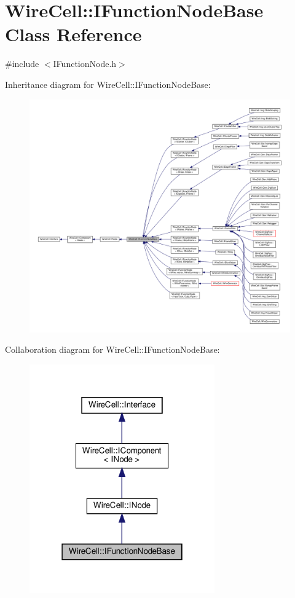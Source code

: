 \hypertarget{class_wire_cell_1_1_i_function_node_base}{}\section{Wire\+Cell\+:\+:I\+Function\+Node\+Base Class Reference}
\label{class_wire_cell_1_1_i_function_node_base}


{\ttfamily \#include $<$I\+Function\+Node.\+h$>$}



Inheritance diagram for Wire\+Cell\+:\+:I\+Function\+Node\+Base\+:
\nopagebreak
\begin{figure}[H]
\begin{center}
\leavevmode
\includegraphics[width=350pt]{class_wire_cell_1_1_i_function_node_base__inherit__graph}
\end{center}
\end{figure}


Collaboration diagram for Wire\+Cell\+:\+:I\+Function\+Node\+Base\+:
\nopagebreak
\begin{figure}[H]
\begin{center}
\leavevmode
\includegraphics[width=226pt]{class_wire_cell_1_1_i_function_node_base__coll__graph}
\end{center}
\end{figure}
